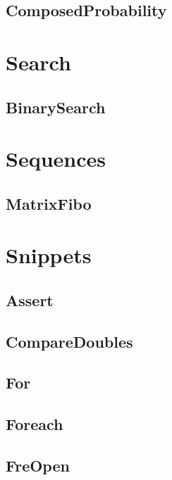 \subsection{ ComposedProbability}
\raggedbottom
\hrulefill

\section{Search}
\subsection{ BinarySearch}
\raggedbottom
\hrulefill

\section{Sequences}
\subsection{ MatrixFibo}
\raggedbottom
\hrulefill

\section{Snippets}
\subsection{ Assert}
\raggedbottom
\hrulefill
\subsection{ CompareDoubles}
\raggedbottom
\hrulefill
\subsection{ For}
\raggedbottom
\hrulefill
\subsection{ Foreach}
\raggedbottom
\hrulefill
\subsection{ FreOpen}
\raggedbottom
\hrulefill
